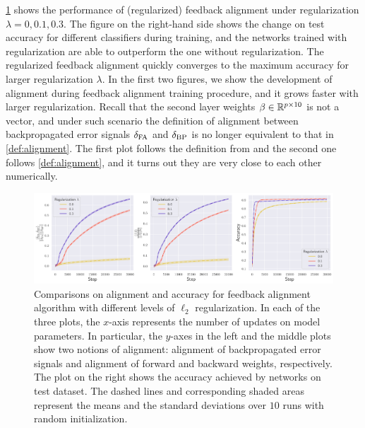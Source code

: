 \cref{fig:mnist} shows the performance of (regularized) feedback alignment under regularization $\lambda = 0, 0.1, 0.3$. The figure on the right-hand side shows the change on test accuracy for different classifiers during training, and the networks trained with regularization are able to outperform the one without regularization. The regularized feedback alignment quickly converges to the maximum accuracy for larger regularization $\lambda$. In the first two figures, we show the development of alignment during feedback alignment training procedure, and it grows faster with larger regularization. Recall that the second layer weights $\beta\in\mathbb{R}^{p\times 10}$ is not a vector, and under such scenario the definition of alignment between backpropagated error signals $\delta_\mathrm{FA}$ and $\delta_\mathrm{BP}$ is no longer equivalent to that in \cref{def:alignment}. The first plot follows the definition from \citep{lillicrap2016random} and the second one follows \cref{def:alignment}, and it turns out they are very close to each other numerically.

\begin{figure}[t]
  \centering
  \includegraphics[width=\textwidth]{figures/mnist_2l_v6_horizontal.pdf}
  \caption{Comparisons on alignment and accuracy for feedback alignment algorithm with different levels of $\ell_2$ regularization. In each of the three plots, the $x$-axis represents the number of updates on model parameters. In particular, the $y$-axes in the left and the middle plots show two notions of alignment: alignment of backpropagated error signals and alignment of forward and backward weights, respectively. The plot on the right shows the accuracy achieved by networks on test dataset. The dashed lines and corresponding shaded areas represent the means and the standard deviations over $10$ runs with random initialization.}
  \label{fig:mnist}
\end{figure}